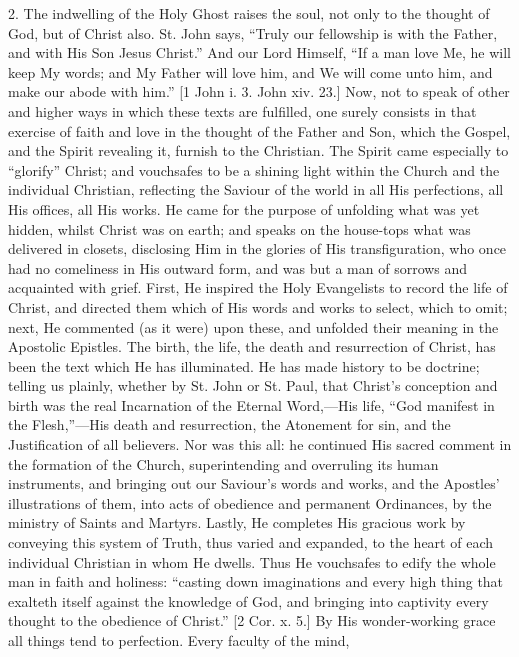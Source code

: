 2. The indwelling of the Holy Ghost raises the soul, not only to the
thought of God, but of Christ also. St. John says, ``Truly our
fellowship is with the Father, and with His Son Jesus Christ.'' And
our Lord Himself, ``If a man love Me, he will keep My words; and My
Father will love him, and We will come unto him, and make our abode with
him.'' [1 John i. 3. John xiv. 23.] Now, not to speak of other and
higher ways in which these texts are fulfilled, one surely consists in
that exercise of faith and love in the thought of the Father and Son,
which the Gospel, and the Spirit revealing it, furnish to the Christian.
The Spirit came especially to ``glorify'' Christ; and vouchsafes
to be a shining light within the Church and the individual Christian,
reflecting the Saviour of the world in all His perfections, all His
offices, all His works. He came for the purpose of unfolding what was
yet hidden, whilst Christ was on earth; and speaks on the house-tops
what was delivered in closets, disclosing Him in the glories of His
transfiguration, who once had no comeliness in His outward form, and was
but a man of sorrows and acquainted with grief. First, He inspired the
Holy Evangelists to record the life of Christ, and directed them which
of His words and works to select, which to omit; next, He commented (as
it were) upon these, and unfolded their meaning in the Apostolic
Epistles. The birth, the life, the death and resurrection of Christ, has
been the text which He has illuminated. He has made history to be
doctrine; telling us plainly, whether by St. John or St. Paul, that
Christ's conception and birth was the real Incarnation of the Eternal
Word,—His life, ``God manifest in the Flesh,''—His death and
resurrection, the Atonement for sin, and the Justification of all
believers. Nor was this all: he continued His sacred comment in the
formation of the Church, superintending and overruling its human
instruments, and bringing out our Saviour's words and works, and the
Apostles' illustrations of them, into acts of obedience and permanent
Ordinances, by the ministry of Saints and Martyrs. Lastly, He completes
His gracious work by conveying this system of Truth, thus varied and
expanded, to the heart of each individual Christian in whom He dwells.
Thus He vouchsafes to edify the whole man in faith and holiness:
``casting down imaginations and every high thing that exalteth
itself against the knowledge of God, and bringing into captivity every
thought to the obedience of Christ.'' [2 Cor. x. 5.] By His wonder-working grace all things tend to perfection. Every faculty of the mind,
